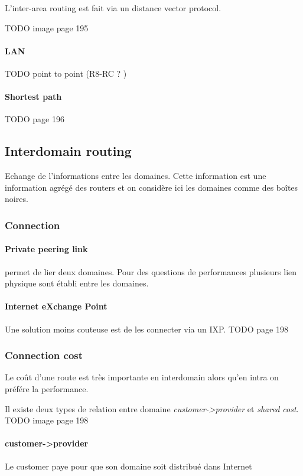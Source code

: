 L'inter-area routing est fait via un distance vector protocol.

TODO image page 195

\paragraph{LAN}
TODO point to point (R8-RC ? )

\paragraph{Shortest path}
TODO page 196

\subsection{Interdomain routing}
Echange de l'informations entre les domaines. Cette information est une information
agrégé des routers et on considère ici les domaines comme des boîtes noires.

\subsubsection{Connection}

\paragraph{Private peering link} permet de lier deux domaines. Pour des questions
de performances plusieurs lien physique sont établi entre les domaines.

\paragraph{Internet eXchange Point} Une solution moins couteuse est de les connecter
via un IXP. TODO page 198

\subsubsection{Connection cost} Le coût d'une route est très importante en interdomain
alors qu'en intra on préfére la performance.

Il existe deux types de relation entre domaine \textit{customer->provider} et \textit{
shared cost}.
TODO image page 198

\paragraph{customer->provider}
Le customer paye pour que son domaine soit distribué dans Internet

